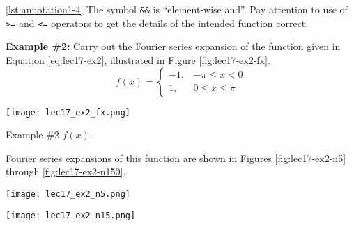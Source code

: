 \vspace{0.25cm}

\noindent \ref{lst:annotation1-4} The symbol \lstinline{&&} is ``element-wise and''.  Pay attention to use of \lstinline{>=} and \lstinline{<=} operators to get the details of the intended function correct.

\vspace{0.5cm}

\noindent\textbf{Example \#2:}  Carry out the Fourier series expansion of the function given in Equation \ref{eq:lec17-ex2}, illustrated in Figure \ref{fig:lec17-ex2-fx}.
\begin{equation}
f(x) = 
\begin{cases}
-1, & -\pi \le x < 0 \\
1, & 0 \le x \le \pi
\end{cases}
\label{eq:lec17-ex2}
\end{equation}
\begin{marginfigure}[-6.0cm]
\texttt{[image: lec17\_ex2\_fx.png]}
\caption{Example \#2 $f(x)$.}
\label{fig:lec17-ex2-fx}
\end{marginfigure}
Fourier series expansions of this function are shown in Figures \ref{fig:lec17-ex2-n5} through \ref{fig:lec17-ex2-n150}.
\begin{marginfigure}[-1.0cm]
\texttt{[image: lec17\_ex2\_n5.png]}
\caption{Fourier series expansion with \lstinline{N=5}.}
\label{fig:lec17-ex2-n5}
\end{marginfigure}

\begin{marginfigure}
\texttt{[image: lec17\_ex2\_n15.png]}
\caption{Fourier series expansion with \lstinline{N=15}.}
\label{fig:lec17-ex2-n15}
\end{marginfigure}

